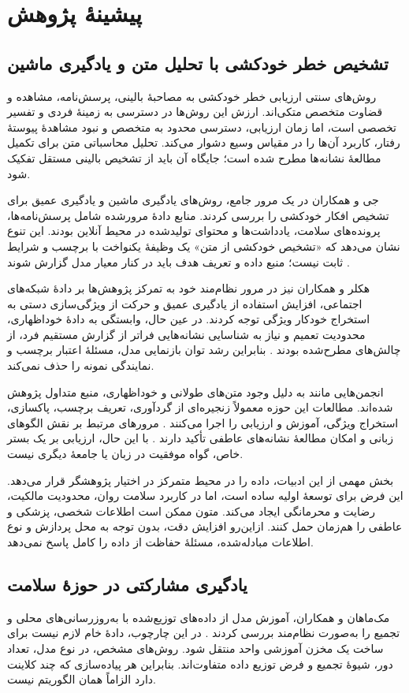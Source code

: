 \section{پیشینۀ پژوهش}
\subsection{تشخیص خطر خودکشی با تحلیل متن و یادگیری ماشین}
روش‌های سنتی ارزیابی خطر خودکشی به مصاحبۀ بالینی، پرسش‌نامه، مشاهده و قضاوت متخصص متکی‌اند. ارزش این روش‌ها در دسترسی به زمینۀ فردی و تفسیر تخصصی است، اما زمان ارزیابی، دسترسی محدود به متخصص و نبود مشاهدۀ پیوستۀ رفتار، کاربرد آن‌ها را در مقیاس وسیع دشوار می‌کند. تحلیل محاسباتی متن برای تکمیل مطالعۀ نشانه‌ها مطرح شده است؛ جایگاه آن باید از تشخیص بالینی مستقل تفکیک شود.

جی و همکاران در یک مرور جامع، روش‌های یادگیری ماشین و یادگیری عمیق برای تشخیص افکار خودکشی را بررسی کردند. منابع دادۀ مرورشده شامل پرسش‌نامه‌ها، پرونده‌های سلامت، یادداشت‌ها و محتوای تولیدشده در محیط آنلاین بودند. این تنوع نشان می‌دهد که «تشخیص خودکشی از متن» یک وظیفۀ یکنواخت با برچسب و شرایط ثابت نیست؛ منبع داده و تعریف هدف باید در کنار معیار مدل گزارش شوند \cite{ref11}.

هکلر و همکاران نیز در مرور نظام‌مند خود به تمرکز پژوهش‌ها بر دادۀ شبکه‌های اجتماعی، افزایش استفاده از یادگیری عمیق و حرکت از ویژگی‌سازی دستی به استخراج خودکار ویژگی توجه کردند. در عین حال، وابستگی به دادۀ خوداظهاری، محدودیت تعمیم و نیاز به شناسایی نشانه‌هایی فراتر از گزارش مستقیم فرد، از چالش‌های مطرح‌شده بودند \cite{ref12}. بنابراین رشد توان بازنمایی مدل، مسئلۀ اعتبار برچسب و نمایندگی نمونه را حذف نمی‌کند.

انجمن‌هایی مانند  به دلیل وجود متن‌های طولانی و خوداظهاری، منبع متداول پژوهش شده‌اند. مطالعات این حوزه معمولاً زنجیره‌ای از گردآوری، تعریف برچسب، پاکسازی، استخراج ویژگی، آموزش و ارزیابی را اجرا می‌کنند \cite{ref13}. مرورهای مرتبط بر نقش الگوهای زبانی و امکان مطالعۀ نشانه‌های عاطفی تأکید دارند \cite{ref14}. با این حال، ارزیابی بر یک بستر خاص، گواه موفقیت در زبان یا جامعۀ دیگری نیست.

بخش مهمی از این ادبیات، داده را در محیط متمرکز در اختیار پژوهشگر قرار می‌دهد. این فرض برای توسعۀ اولیه ساده است، اما در کاربرد سلامت روان، محدودیت مالکیت، رضایت و محرمانگی ایجاد می‌کند. متون ممکن است اطلاعات شخصی، پزشکی و عاطفی را هم‌زمان حمل کنند. ازاین‌رو افزایش دقت، بدون توجه به محل پردازش و نوع اطلاعات مبادله‌شده، مسئلۀ حفاظت از داده را کامل پاسخ نمی‌دهد.

\subsection{یادگیری مشارکتی در حوزۀ سلامت}
مک‌ماهان و همکاران، آموزش مدل از داده‌های توزیع‌شده با به‌روزرسانی‌های محلی و تجمیع را به‌صورت نظام‌مند بررسی کردند \cite{ref15}. در این چارچوب، دادۀ خام لازم نیست برای ساخت یک مخزن آموزشی واحد منتقل شود. روش‌های مشخص، در نوع مدل، تعداد دور، شیوۀ تجمیع و فرض توزیع داده متفاوت‌اند. بنابراین هر پیاده‌سازی که چند کلاینت دارد الزاماً همان الگوریتم  نیست.


